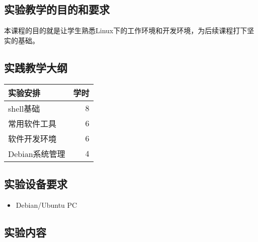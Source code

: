 \documentclass{wx672article}
\begin{document}
\subsection{实验教学的目的和要求}
本课程的目的就是让学生熟悉Linux下的工作环境和开发环境，为后续课程打下坚实的基础。

\subsection{实践教学大纲}

\begin{center}
  \begin{tabular}{lr}
    \hline
    实验安排        &  学时  \\
    \hline
    shell基础       &     8  \\
    常用软件工具    &     6  \\
    软件开发环境    &     6  \\
    Debian系统管理  &     4  \\
    \hline
  \end{tabular}
\end{center}

\subsection{实验设备要求}

\begin{itemize}
\item Debian/Ubuntu PC
\end{itemize}

\subsection{实验内容}
\end{document}
